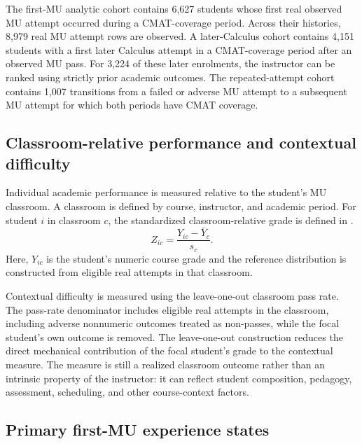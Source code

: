 The first-MU analytic cohort contains 6,627 students whose first real observed MU attempt occurred during a CMAT-coverage period. Across their histories, 8,979 real MU attempt rows are observed. A later-Calculus cohort contains 4,151 students with a first later Calculus attempt in a CMAT-coverage period after an observed MU pass. For 3,224 of these later enrolments, the instructor can be ranked using strictly prior academic outcomes. The repeated-attempt cohort contains 1,007 transitions from a failed or adverse MU attempt to a subsequent MU attempt for which both periods have CMAT coverage.

\subsection{Classroom-relative performance and contextual difficulty}

Individual academic performance is measured relative to the student's MU classroom. A classroom is defined by course, instructor, and academic period. For student $i$ in classroom $c$, the standardized classroom-relative grade is defined in .
\begin{equation}
Z_{ic}=\frac{Y_{ic}-\bar{Y}_{c}}{s_c}.
\label{eq:classroom-z}
\end{equation}
Here, $Y_{ic}$ is the student's numeric course grade and the reference distribution is constructed from eligible real attempts in that classroom.

Contextual difficulty is measured using the leave-one-out classroom pass rate. The pass-rate denominator includes eligible real attempts in the classroom, including adverse nonnumeric outcomes treated as non-passes, while the focal student's own outcome is removed. The leave-one-out construction reduces the direct mechanical contribution of the focal student's grade to the contextual measure. The measure is still a realized classroom outcome rather than an intrinsic property of the instructor: it can reflect student composition, pedagogy, assessment, scheduling, and other course-context factors.

\subsection{Primary first-MU experience states}

